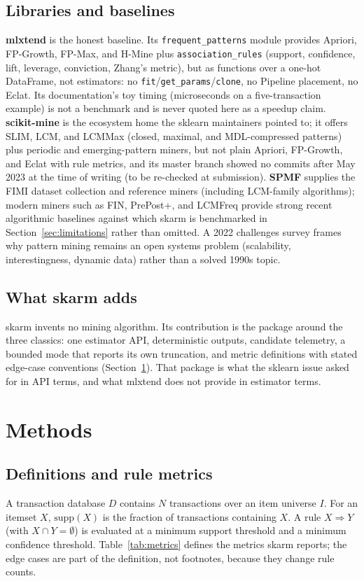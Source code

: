 \documentclass[journal,a4paper]{IEEEtran}
\newcommand{\skarm}{skarm\xspace}
\begin{document}
\subsection{Libraries and baselines}
\textbf{mlxtend} \cite{mlxtend} is the honest baseline. Its
\texttt{frequent\_patterns} module provides Apriori, FP-Growth, FP-Max,
and H-Mine plus \texttt{association\_rules} (support, confidence,
lift, leverage, conviction, Zhang's metric), but as functions over a
one-hot DataFrame, not estimators: no
\texttt{fit}/\texttt{get\_params}/\texttt{clone}, no Pipeline
placement, no Eclat. Its documentation's toy timing (microseconds on a
five-transaction example) is not a benchmark and is never quoted here
as a speedup claim. \textbf{scikit-mine} \cite{scikitmine} is the
ecosystem home the sklearn maintainers pointed to; it offers SLIM,
LCM, and LCMMax (closed, maximal, and MDL-compressed patterns) plus
periodic and emerging-pattern miners, but not plain Apriori, FP-Growth,
and Eclat with rule metrics, and its master branch showed no commits
after May 2023 at the time of writing (to be re-checked at submission).
\textbf{SPMF} \cite{spmf} supplies the FIMI dataset collection and
reference miners (including LCM-family algorithms); modern miners such
as FIN, PrePost+, and LCMFreq \cite{kallay2025} provide strong recent
algorithmic baselines against which \skarm is benchmarked in
Section~\ref{sec:limitations} rather than omitted. A 2022
challenges survey \cite{fournier2022} frames why pattern mining
remains an open systems problem (scalability, interestingness, dynamic
data) rather than a solved 1990s topic.

\subsection{What \skarm adds}
\skarm invents no mining algorithm. Its contribution is the package
around the three classics: one estimator API, deterministic outputs,
candidate telemetry, a bounded mode that reports its own truncation,
and metric definitions with stated edge-case conventions
(Section~\ref{sec:methods}). That package is what the sklearn issue
asked for in API terms, and what mlxtend does not provide in estimator
terms.

\section{Methods}
\label{sec:methods}

\subsection{Definitions and rule metrics}
A transaction database $D$ contains $N$ transactions over an item
universe $I$. For an itemset $X$, $\mathrm{supp}(X)$ is the fraction of
transactions containing $X$. A rule $X \Rightarrow Y$ (with $X \cap Y =
\emptyset$) is evaluated at a minimum support threshold and a minimum
confidence threshold. Table~\ref{tab:metrics} defines the metrics
\skarm reports; the edge cases are part of the definition, not footnotes,
because they change rule counts.
\end{document}
